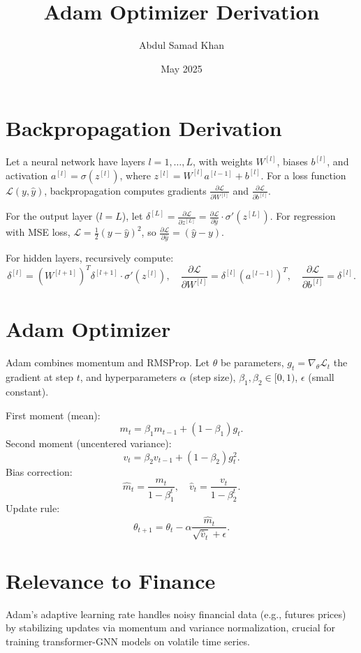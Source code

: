 \documentclass{article}
\begin{document}
\title{Adam Optimizer Derivation}
\author{Abdul Samad Khan}
\date{May 2025}
\maketitle

\section{Backpropagation Derivation}
Let a neural network have layers $l=1,\dots,L$, with weights $W^{[l]}$, biases $b^{[l]}$, and activation $a^{[l]} = \sigma(z^{[l]})$, where $z^{[l]} = W^{[l]}a^{[l-1]} + b^{[l]}$. For a loss function $\mathcal{L}(y, \hat{y})$, backpropagation computes gradients $\frac{\partial \mathcal{L}}{\partial W^{[l]}}$ and $\frac{\partial \mathcal{L}}{\partial b^{[l]}}$.

For the output layer ($l=L$), let $\delta^{[L]} = \frac{\partial \mathcal{L}}{\partial z^{[L]}} = \frac{\partial \mathcal{L}}{\partial \hat{y}} \cdot \sigma'(z^{[L]})$. For regression with MSE loss, $\mathcal{L} = \frac{1}{2}(y - \hat{y})^2$, so $\frac{\partial \mathcal{L}}{\partial \hat{y}} = (\hat{y} - y)$.

For hidden layers, recursively compute:
\[
\delta^{[l]} = (W^{[l+1]})^T \delta^{[l+1]} \cdot \sigma'(z^{[l]}), \quad \frac{\partial \mathcal{L}}{\partial W^{[l]}} = \delta^{[l]} (a^{[l-1]})^T, \quad \frac{\partial \mathcal{L}}{\partial b^{[l]}} = \delta^{[l]}.
\]

\section{Adam Optimizer}
Adam combines momentum and RMSProp. Let $\theta$ be parameters, $g_t = \nabla_\theta \mathcal{L}_t$ the gradient at step $t$, and hyperparameters $\alpha$ (step size), $\beta_1, \beta_2 \in [0,1)$, $\epsilon$ (small constant).

First moment (mean):
\[
m_t = \beta_1 m_{t-1} + (1 - \beta_1) g_t.
\]
Second moment (uncentered variance):
\[
v_t = \beta_2 v_{t-1} + (1 - \beta_2) g_t^2.
\]
Bias correction:
\[
\hat{m}_t = \frac{m_t}{1 - \beta_1^t}, \quad \hat{v}_t = \frac{v_t}{1 - \beta_2^t}.
\]
Update rule:
\[
\theta_{t+1} = \theta_t - \alpha \frac{\hat{m}_t}{\sqrt{\hat{v}_t} + \epsilon}.
\]

\section{Relevance to Finance}
Adam’s adaptive learning rate handles noisy financial data (e.g., futures prices) by stabilizing updates via momentum and variance normalization, crucial for training transformer-GNN models on volatile time series.
\end{document}
